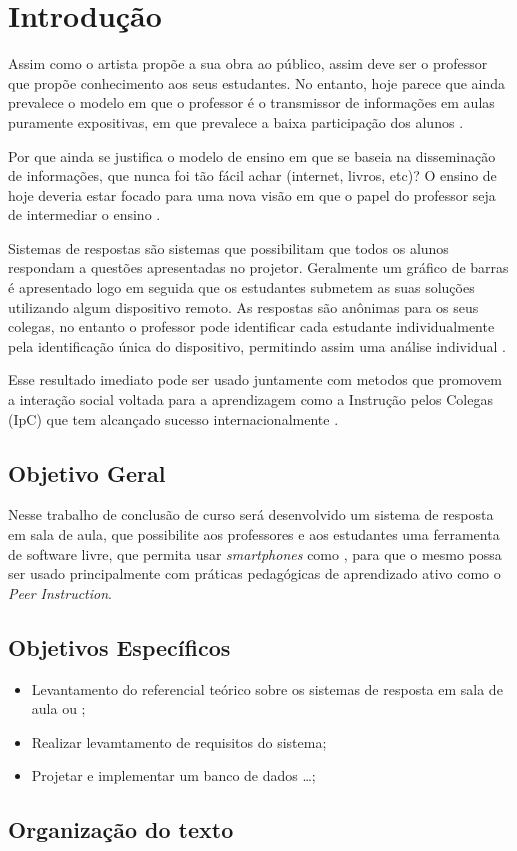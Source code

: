 \chapter{Introdução}

Assim como o artista propõe a sua obra ao público, assim deve ser o professor que
propõe conhecimento aos seus estudantes. No entanto, hoje parece que ainda prevalece
o modelo em que o professor é o transmissor de informações em aulas puramente expositivas,
em que prevalece a baixa participação dos alunos \cite[p. 8]{Silva2001}.

Por que ainda se justifica o modelo de ensino em que se baseia
na disseminação de informações, que nunca foi tão fácil achar (internet,
livros, etc)? O ensino de hoje deveria estar focado para uma nova
visão em que o papel do professor seja de intermediar o ensino \cite[p. 19]{Araujo2013}.

Sistemas de respostas são sistemas que possibilitam que todos os alunos
respondam a questões apresentadas no projetor. Geralmente um gráfico de barras
é apresentado logo em seguida que os estudantes submetem as suas soluções
utilizando algum dispositivo remoto. As respostas são anônimas para os seus colegas,
no entanto o professor pode identificar cada estudante individualmente pela
identificação única do dispositivo, permitindo assim uma análise individual \cite[p. 1]{Kay2009}.


Esse resultado imediato pode ser usado juntamente
com metodos que promovem a interação social voltada para a aprendizagem como a
Instrução pelos Colegas (IpC) que tem alcançado sucesso internacionalmente \cite[p. 3]{Araujo2013}.

\section{Objetivo Geral}
Nesse trabalho de conclusão de curso será desenvolvido um sistema de resposta em sala de aula,
que possibilite aos professores e aos estudantes uma ferramenta de software livre,
que permita usar {\textit{smartphones}} como {\clickers} \cite{Bind2015, Orlandi2012}, para que o mesmo possa
ser usado principalmente com práticas pedagógicas de aprendizado ativo como o \textit{Peer Instruction}.

\section{Objetivos Específicos}

\begin{itemize}
    \item Levantamento do referencial te\'orico sobre os sistemas de resposta
    em sala de aula ou {\clickers};
    \item Realizar levamtamento de requisitos do sistema;
    \item Projetar e implementar um banco de dados \ldots;
\end{itemize}

\section{Organização do texto}

